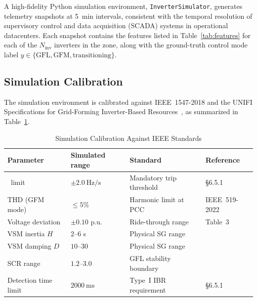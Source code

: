 \documentclass[journal]{IEEEtran}
\newcommand{\rocof}{\text{RoCoF}}
\newcommand{\gfl}{\text{GFL}}
\newcommand{\gfm}{\text{GFM}}
\begin{document}
A high-fidelity Python simulation environment, \texttt{InverterSimulator},
generates telemetry snapshots at \SI{5}{\minute} intervals, consistent
with the temporal resolution of supervisory control and data acquisition
(SCADA) systems in operational datacenters.
Each snapshot contains the features listed in Table~\ref{tab:features}
for each of the $N_\text{inv}$ inverters in the zone, along with the
ground-truth control mode label $y \in \{\gfl, \gfm, \text{transitioning}\}$.

\subsection{Simulation Calibration}

The simulation environment is calibrated against IEEE~1547-2018 and
the UNIFI Specifications for Grid-Forming Inverter-Based
Resources~\cite{b_unifi}, as summarized in Table~\ref{tab:calibration}.

\begin{table}[!t]
\renewcommand{\arraystretch}{1.25}
\caption{Simulation Calibration Against IEEE Standards}
\label{tab:calibration}
\centering
\begin{tabular}{@{}llll@{}}
\toprule
Parameter & Simulated range & Standard & Reference \\
\midrule
\rocof\ limit            & $\pm\SI{2.0}{\hertz\per\second}$ & Mandatory trip threshold   & \cite{b_ieee1547} §6.5.1 \\
THD (GFM mode)           & $\leq 5\%$                       & Harmonic limit at PCC      & IEEE~519-2022 \\
Voltage deviation        & $\pm 0.10$ p.u.                  & Ride-through range         & \cite{b_ieee1547} Table~3 \\
VSM inertia $H$          & $2\text{--}6$ s                  & Physical SG range          & \cite{b_vsm_review} \\
VSM damping $D$          & $10\text{--}30$                  & Physical SG range          & \cite{b_vsm_review} \\
SCR range                & $1.2\text{--}3.0$                & GFL stability boundary     & \cite{b_rocabert2012} \\
Detection time limit     & $\SI{2000}{\milli\second}$       & Type~I IBR requirement     & \cite{b_ieee1547} §6.5.1 \\
\bottomrule
\end{tabular}
\end{table}
\end{document}
